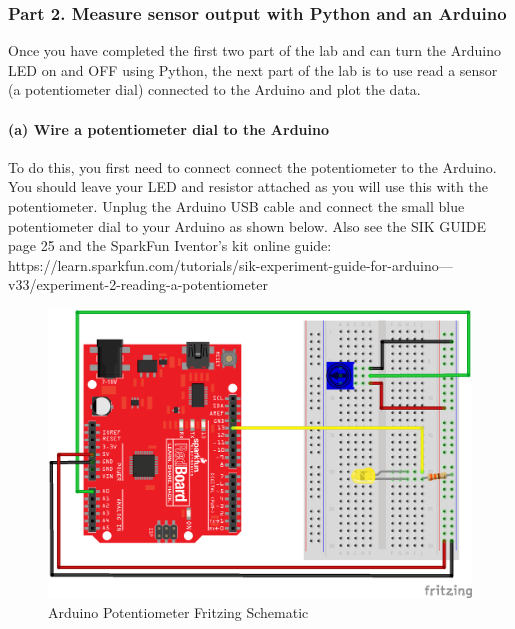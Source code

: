 \documentclass[11pt]{article}
\makeatletter
\def\maxwidth{\ifdim\Gin@nat@width>\linewidth\linewidth
    \else\Gin@nat@width\fi}
\let\Oldincludegraphics\includegraphics
\renewcommand{\includegraphics}[1]{\Oldincludegraphics[width=.8\maxwidth]{#1}}
\makeatother
\begin{document}
    \hypertarget{part-2.-measure-sensor-output-with-python-and-an-arduino}{%
\subsubsection{Part 2. Measure sensor output with Python and an
Arduino}\label{part-2.-measure-sensor-output-with-python-and-an-arduino}}

Once you have completed the first two part of the lab and can turn the
Arduino LED on and OFF using Python, the next part of the lab is to use
read a sensor (a potentiometer dial) connected to the Arduino and plot
the data.

    \hypertarget{a-wire-a-potentiometer-dial-to-the-arduino}{%
\paragraph{(a) Wire a potentiometer dial to the
Arduino}\label{a-wire-a-potentiometer-dial-to-the-arduino}}

To do this, you first need to connect connect the potentiometer to the
Arduino. You should leave your LED and resistor attached as you will use
this with the potentiometer. Unplug the Arduino USB cable and connect
the small blue potentiometer dial to your Arduino as shown below. Also
see the SIK GUIDE page 25 and the SparkFun Iventor's kit online guide:
https://learn.sparkfun.com/tutorials/sik-experiment-guide-for-arduino---v33/experiment-2-reading-a-potentiometer

\begin{figure}
\centering
\includegraphics{images/redboard_pot_led_fritzing.png}
\caption{Arduino Potentiometer Fritzing Schematic}
\end{figure}
\end{document}
